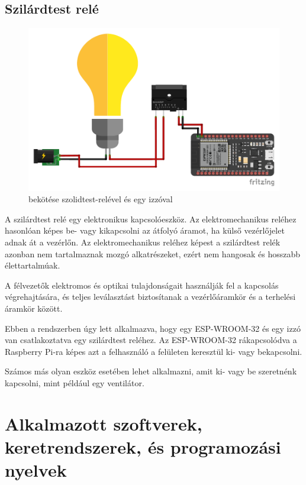 \documentclass[
]{thesis-ekf}
\theoremstyle{definition}
\theoremstyle{remark}
\begin{document}
	\subsection{Szilárdtest relé}
	\begin{figure}[ht!]
		\centering
		\includegraphics[width=1\textwidth]{./src/schematics/ESP32 toggle schematics_bb}
		\caption{ bekötése szolidtest-relével és egy izzóval}
		\label{toggle-schematics}
	\end{figure}	
	
	A szilárdtest relé egy elektronikus kapcsolóeszköz. Az elektromechanikus reléhez hasonlóan képes be- vagy kikapcsolni az átfolyó áramot, ha külső vezérlőjelet adnak át a vezérlőn. Az elektromechanikus reléhez képest a szilárdtest relék azonban nem tartalmaznak mozgó alkatrészeket, ezért nem hangosak és hosszabb élettartalmúak. 
	
	A félvezetők elektromos és optikai tulajdonságait használják fel a kapcsolás végrehajtására, és teljes leválasztást biztosítanak a vezérlőáramkör és a terhelési áramkör között.\cite{solid-state-relay}
	
	Ebben a rendszerben úgy lett alkalmazva, hogy egy ESP-WROOM-32 és egy izzó van csatlakoztatva egy szilárdtest reléhez. Az ESP-WROOM-32 rákapcsolódva a Raspberry Pi-ra képes azt a felhasználó a felületen keresztül ki- vagy bekapcsolni.
	
	Számos más olyan eszköz esetében lehet alkalmazni, amit ki- vagy be szeretnénk kapcsolni, mint például egy ventilátor.
	
	\section{Alkalmazott szoftverek, keretrendszerek, és programozási nyelvek}
\end{document}
